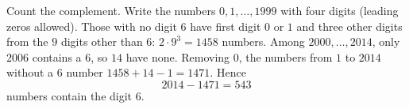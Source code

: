 Count the complement. Write the numbers $0,1,\dots,1999$ with four digits (leading zeros allowed). Those with no digit $6$ have first digit $0$ or $1$ and three other digits from the $9$ digits other than $6$: $2\cdot9^3=1458$ numbers. Among $2000,\dots,2014$, only $2006$ contains a $6$, so $14$ have none. Removing $0$, the numbers from $1$ to $2014$ without a $6$ number $1458+14-1=1471$. Hence
\[
2014-1471=\boxed{543}
\]
numbers contain the digit $6$.
